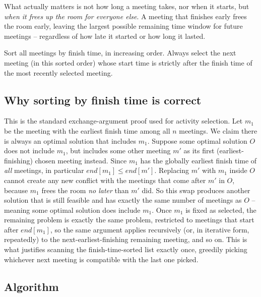 What actually matters is not how long a meeting takes, nor when it starts,
but \emph{when it frees up the room for everyone else}. A meeting that
finishes early frees the room early, leaving the largest possible remaining
time window for future meetings -- regardless of how late it started or how
long it lasted.

\begin{ideabox}
Sort all meetings by finish time, in increasing order. Always select the
next meeting (in this sorted order) whose start time is strictly after the
finish time of the most recently selected meeting.
\end{ideabox}

\subsection*{Why sorting by finish time is correct}

This is the standard exchange-argument proof used for activity selection.
Let $m_1$ be the meeting with the earliest finish time among all $n$
meetings. We claim there is always an optimal solution that includes $m_1$.
Suppose some optimal solution $O$ does not include $m_1$, but includes some
other meeting $m'$ as its first (earliest-finishing) chosen meeting instead.
Since $m_1$ has the globally earliest finish time of \emph{all} meetings, in
particular $\textit{end}[m_1] \le \textit{end}[m']$. Replacing $m'$ with
$m_1$ inside $O$ cannot create any new conflict with the meetings that come
after $m'$ in $O$, because $m_1$ frees the room \emph{no later} than $m'$
did. So this swap produces another solution that is still feasible and has
exactly the same number of meetings as $O$ -- meaning some optimal solution
does include $m_1$. Once $m_1$ is fixed as selected, the remaining problem
is exactly the same problem, restricted to meetings that start after
$\textit{end}[m_1]$, so the same argument applies recursively (or, in
iterative form, repeatedly) to the next-earliest-finishing remaining
meeting, and so on. This is what justifies scanning the finish-time-sorted
list exactly once, greedily picking whichever next meeting is compatible
with the last one picked.

\subsection*{Algorithm}

